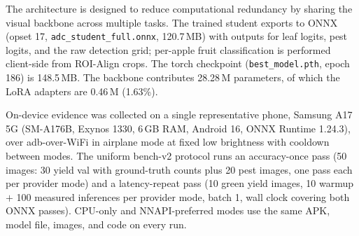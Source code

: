 \documentclass[preprint,12pt]{elsarticle}
\begin{document}
The architecture is designed to reduce computational redundancy by
sharing the visual backbone across multiple tasks. The trained student
exports to ONNX (opset 17, \texttt{adc\_student\_full.onnx}, 120.7\,MB)
with outputs for leaf logits, pest logits, and the raw detection grid;
per-apple fruit classification is performed client-side from ROI-Align
crops. The torch checkpoint (\texttt{best\_model.pth}, epoch 186) is
148.5\,MB. The backbone contributes 28.28\,M parameters, of which the
LoRA adapters are 0.46\,M (1.63\%).

On-device evidence was collected on a single representative phone,
Samsung A17 5G (SM-A176B, Exynos 1330, 6\,GB RAM, Android 16, ONNX
Runtime 1.24.3), over adb-over-WiFi in airplane mode at fixed low
brightness with cooldown between modes. The uniform bench-v2 protocol
runs an accuracy-once pass (50 images: 30 yield val with ground-truth
counts plus 20 pest images, one pass each per provider mode) and a
latency-repeat pass (10 green yield images, 10 warmup $+$ 100 measured
inferences per provider mode, batch 1, wall clock covering both ONNX
passes). CPU-only and NNAPI-preferred modes use the same APK, model
file, images, and code on every run.
\end{document}
